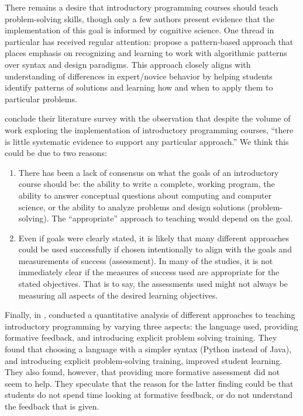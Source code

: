 \documentclass[12pt]{article}
\begin{document}
There remains a desire that introductory programming courses should
teach problem-solving skills, though only a few authors present
evidence that the implementation of this goal is informed by cognitive
science\autocite{kramarski_cognitivemetacognitive_1997,reed_incorporating_1998,muller_supporting_2008}. One
thread in particular has received regular attention:
\citeauthor{east_patternbased_1996} propose a pattern-based approach
that places emphasis on recognizing and learning to work with
algorithmic patterns over syntax and design
paradigms\autocite{east_patternbased_1996}. This approach closely
aligns with understanding of differences in expert/novice behavior by
helping students identify patterns of solutions and learning how and
when to apply them to particular
problems\autocite{east_patternbased_1996,muller_pattern_2005,wallingford_first_1996,reed_incorporating_1998}.

\citeauthor{pears_survey_2007-1} conclude their
\citeyear{pears_survey_2007-1} literature survey with the observation
that despite the volume of work exploring the implementation of
introductory programming courses, ``there is little systematic
evidence to support any particular
approach.''\autocite{pears_survey_2007-1} We think this could be due
to two reasons:

\begin{enumerate}
\item There has been a lack of consensus on what the goals of an
  introductory course should be: the ability to write a complete,
  working program, the ability to answer conceptual questions about
  computing and computer science, or the ability to analyze problems
  and design solutions (problem-solving). The ``appropriate'' approach
  to teaching would depend on the goal.

\item Even if goals were clearly stated, it is likely that many
  different approaches could be used successfully if chosen
  intentionally to align with the goals and measurements of success
  (assessment). In many of the studies, it is not immediately clear if
  the measures of success used are appropriate for the stated
  objectives. That is to say, the assessments used might not always be
  measuring all aspects of the desired learning objectives.
\end{enumerate}

Finally, in \citeyear{koulouri_teaching_2014},
\citeauthor{koulouri_teaching_2014} conducted a quantitative analysis
of different approaches to teaching introductory programming by
varying three aspects: the language used, providing formative
feedback, and introducing explicit problem solving
training\autocite{koulouri_teaching_2014}. They found that choosing a
language with a simpler syntax (Python instead of Java), and
introducing explicit problem-solving training, improved student
learning. They also found, however, that providing more formative
assessment did not seem to help. They speculate that the reason for
the latter finding could be that students do not spend time looking at
formative feedback, or do not understand the feedback that is given.
\end{document}
